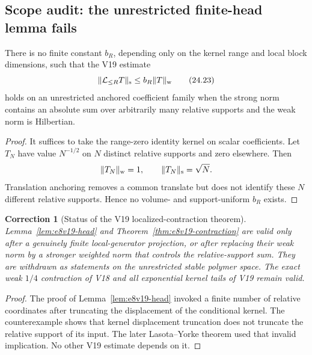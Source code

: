 \documentclass[11pt,oneside]{book}
\newtheorem{correction}[theorem]{Correction}
\theoremstyle{definition}
\theoremstyle{remark}
\begin{document}
\subsection{Scope audit: the unrestricted finite-head lemma fails}

\begin{counterexample}
\label{cth:e8v24-l2-l1}
There is no finite constant \(b_R\), depending only on the kernel
range and local block dimensions, such that the V19 estimate
\[
\|\mathcal L_{\leq R}T\|_{\rm s}\leq b_R\|T\|_{\rm w}              \tag{24.23}
\]
holds on an unrestricted anchored coefficient family when the strong
norm contains an absolute sum over arbitrarily many relative supports
and the weak norm is Hilbertian.
\end{counterexample}

\begin{proof}
It suffices to take the range-zero identity kernel on scalar
coefficients.  Let \(T_N\) have value \(N^{-1/2}\) on \(N\) distinct
relative supports and zero elsewhere.  Then
\[
\|T_N\|_{\rm w}=1,\qquad \|T_N\|_{\rm s}=\sqrt N.
\]
Translation anchoring removes a common translate but does not identify
these \(N\) different relative supports.  Hence no volume- and
support-uniform \(b_R\) exists.
\end{proof}

\begin{correction}[Status of the V19 localized-contraction theorem]
\label{corr:e8v24-v19}
Lemma~\ref{lem:e8v19-head} and
Theorem~\ref{thm:e8v19-contraction} are valid only after a genuinely
finite local-generator projection, or after replacing their weak norm
by a stronger weighted norm that controls the relative-support sum.
They are withdrawn as statements on the unrestricted stable polymer
space.  The exact weak \(1/4\) contraction of V18 and all exponential
kernel tails of V19 remain valid.
\end{correction}

\begin{proof}
The proof of Lemma~\ref{lem:e8v19-head} invoked a finite number of
relative coordinates after truncating the displacement of the
conditional kernel.  The counterexample shows that kernel displacement
truncation does not truncate the relative support of its input.
The later Lasota--Yorke theorem used that invalid implication.  No
other V19 estimate depends on it.
\end{proof}
\end{document}
